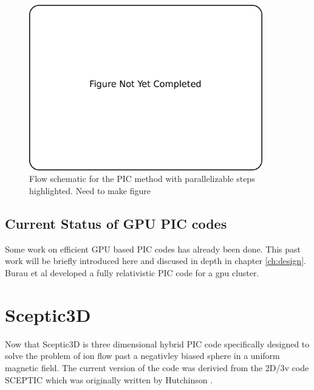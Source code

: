 \begin{figure}
\begin{center}
\includegraphics[width=4in]{introduction/not_finished.pdf}
\end{center}
\caption{Flow schematic for the PIC method with parallelizable steps highlighted. Need to make figure}
\label{fig:pic_flowchart_parallel}
\end{figure}

		\subsection{Current Status of GPU PIC codes}

						Some work on efficient GPU based PIC codes has already been done. This past work will be briefly introduced here and discused in depth in chapter \ref{ch:design}. Burau et al developed a fully relativistic PIC code for a gpu cluster. 
		

	\section{Sceptic3D}
Now that Sceptic3D is three dimensional hybrid PIC code specifically designed to solve the problem of ion flow past a negativley biased sphere in a uniform magnetic field. The current version of the code was derivied from the 2D/3v code SCEPTIC which was originally written by Hutchinson \cite{Hutchinson2002,Hutchinson2003,Hutchinson2005,Hutchinson2006}.

